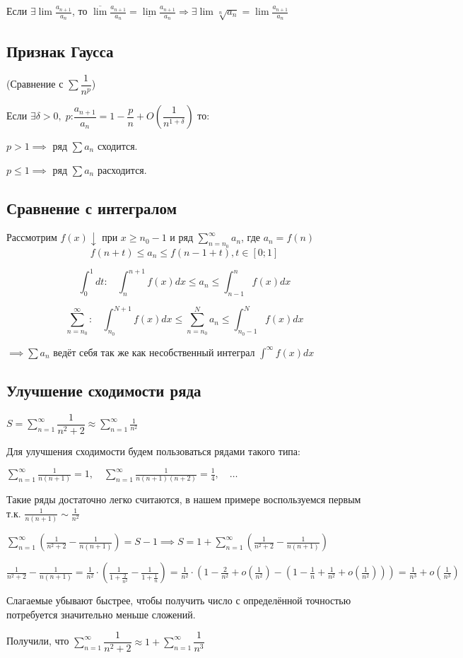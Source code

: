 Если $\exists \lim \frac{a_{n+1}}{a_n}$, то $\overline{\lim} \frac{a_{n+1}}{a_n} = \underline{\lim} \frac{a_{n+1}}{a_n} \Rightarrow \exists \lim \sqrt[n]{a_n} = \lim \frac{a_{n+1}}{a_n}$

\subsection{Признак Гаусса}
(Сравнение с $\sum \dfrac{1}{n^p}$)

Если $\exists \delta > 0,\; p$:$ \dfrac{a_{n+1}}{a_n} = 1 - \dfrac{p}{n} + O\left(\dfrac{1}{n^{1 + \delta}}\right) $
то:

$p > 1 \implies$ ряд $\sum a_n$ сходится.

$p \leq 1 \implies$ ряд $\sum a_n$ расходится.

\subsection{Сравнение с интегралом}

Рассмотрим $f(x) \downarrow$ при $x \geq n_0 - 1$ и ряд $\sum_{n=n_0}^{\infty} a_n$, где $a_n = f(n)$ 
$$f(n + t) \leq a_n \leq f(n - 1 + t), t \in [0; 1]$$

$$\int_{0}^{1} dt : \ \ \ \ \int_{n}^{n+1} f(x)dx \leq a_n \leq \int_{n-1}^{n} f(x)dx$$

$$\sum_{n=n_0}^{\infty} : \ \ \ \ \int_{n_0}^{N+1} f(x)dx \leq \sum_{n=n_0}^{N} a_n \leq \int_{n_0-1}^{N} f(x)dx$$

$\implies \sum a_n$ ведёт себя так же как несобственный интеграл $\int^{\infty}f(x)dx$

\subsection{Улучшение сходимости ряда}

\example $S = \sum_{n=1}^{\infty} \dfrac{1}{n^2 + 2} \approx \sum_{n=1}^{\infty} \frac{1}{n^2}$

Для улучшения сходимости будем пользоваться рядами такого типа:

$\sum_{n=1}^{\infty} \frac{1}{n(n+1)} = 1,\quad \sum_{n=1}^{\infty} \frac{1}{n(n+1)(n+2)} = \frac{1}{4},\quad \dots$

Такие ряды достаточно легко считаются, в нашем примере воспользуемся первым т.к. $\frac{1}{n(n+1)} \sim \frac{1}{n^2}$

$\sum_{n=1}^{\infty} \left(\frac{1}{n^2+2} - \frac{1}{n(n+1)}\right) = S - 1 \implies S = 1 + \sum_{n=1}^{\infty} \left(\frac{1}{n^2 + 2} - \frac{1}{n(n+1)}\right)$

$\frac{1}{n^2+2} - \frac{1}{n(n+1)} = \frac{1}{n^2} \cdot \left(\frac{1}{1 + \frac{2}{n^2}} - \frac{1}{1 + \frac{1}{n}}\right) = \frac{1}{n^2} \cdot \left(1 - \frac{2}{n^2} + o\left(\frac{1}{n^2}\right) - \left(1 - \frac{1}{n} + \frac{1}{n^2} + o\left(\frac{1}{n^2}\right)\right)\right) = \frac{1}{n^3} + o\left(\frac{1}{n^3}\right)$

Слагаемые убывают быстрее, чтобы получить число с определённой точностью потребуется значительно меньше сложений.

Получили, что $\sum_{n=1}^{\infty} \dfrac{1}{n^2 + 2} \approx 1 + \sum_{n=1}^{\infty} \dfrac{1}{n^3}$


